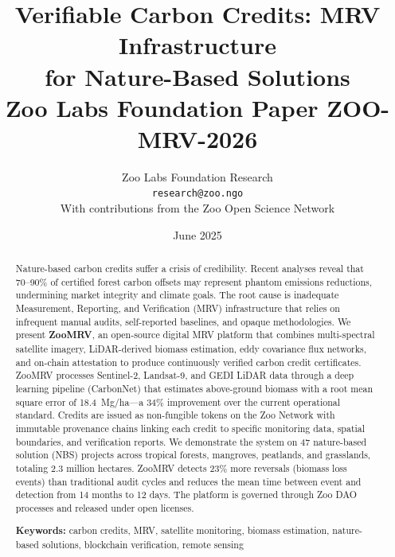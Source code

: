 \documentclass[11pt,a4paper]{article}
\title{%
  \textbf{Verifiable Carbon Credits: MRV Infrastructure\\
  for Nature-Based Solutions}\\[0.5em]
  \large Zoo Labs Foundation Paper ZOO-MRV-2026
}
\author{
  Zoo Labs Foundation Research\\
  \texttt{research@zoo.ngo}\\[0.5em]
  \small With contributions from the Zoo Open Science Network
}
\date{June 2025}
\begin{document}
\zoocoverpage

\begin{abstract}
\noindent
Nature-based carbon credits suffer a crisis of credibility. Recent
analyses reveal that 70--90\% of certified forest carbon offsets may
represent phantom emissions reductions, undermining market integrity and
climate goals. The root cause is inadequate Measurement, Reporting, and
Verification (MRV) infrastructure that relies on infrequent manual
audits, self-reported baselines, and opaque methodologies. We present
\textbf{ZooMRV}, an open-source digital MRV platform that combines
multi-spectral satellite imagery, LiDAR-derived biomass estimation,
eddy covariance flux networks, and on-chain attestation to produce
continuously verified carbon credit certificates. ZooMRV processes
Sentinel-2, Landsat-9, and GEDI LiDAR data through a deep learning
pipeline (CarbonNet) that estimates above-ground biomass with a root
mean square error of 18.4~Mg/ha---a 34\% improvement over the current
operational standard. Credits are issued as non-fungible tokens on the
Zoo Network with immutable provenance chains linking each credit to
specific monitoring data, spatial boundaries, and verification reports.
We demonstrate the system on 47 nature-based solution (NBS) projects
across tropical forests, mangroves, peatlands, and grasslands, totaling
2.3 million hectares. ZooMRV detects 23\% more reversals (biomass loss
events) than traditional audit cycles and reduces the mean time between
event and detection from 14 months to 12 days. The platform is governed
through Zoo DAO processes and released under open licenses.

\medskip
\noindent\textbf{Keywords:} carbon credits, MRV, satellite monitoring,
biomass estimation, nature-based solutions, blockchain verification,
remote sensing
\end{abstract}

\newpage
\tableofcontents
\newpage













\end{document}
